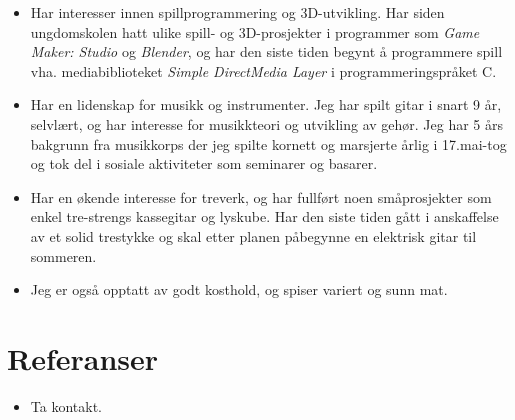 \documentclass[11pt,a4paper,sans, norsk]{moderncv}        %
\begin{document}
\begin{itemize}

\item{Har interesser innen spillprogrammering og 3D-utvikling. Har siden ungdomskolen hatt ulike spill- og 3D-prosjekter i programmer som \textit{Game Maker: Studio} og \textit{Blender}, og har den siste tiden begynt å programmere spill vha. mediabiblioteket \textit{Simple DirectMedia Layer} i programmeringspråket C.}

\vspace{6pt}

\item{Har en lidenskap for musikk og instrumenter. Jeg har spilt gitar i snart 9 år, selvlært, og har interesse for musikkteori og utvikling av gehør. Jeg har 5 års bakgrunn fra musikkorps der jeg spilte kornett og marsjerte årlig i 17.mai-tog og tok del i sosiale aktiviteter som seminarer og basarer.}

\vspace{6pt}

\item{Har en økende interesse for treverk, og har fullført noen småprosjekter som enkel tre-strengs kassegitar og lyskube. Har den siste tiden gått i anskaffelse av et solid trestykke og skal etter planen påbegynne en elektrisk gitar til sommeren.}

\vspace{6pt}

\item{Jeg er også opptatt av godt kosthold, og spiser variert og sunn mat.}

\end{itemize}

\section{Referanser}

\vspace{6pt}
 
\begin{itemize}

\item{Ta kontakt.}

\end{itemize}
\end{document}
